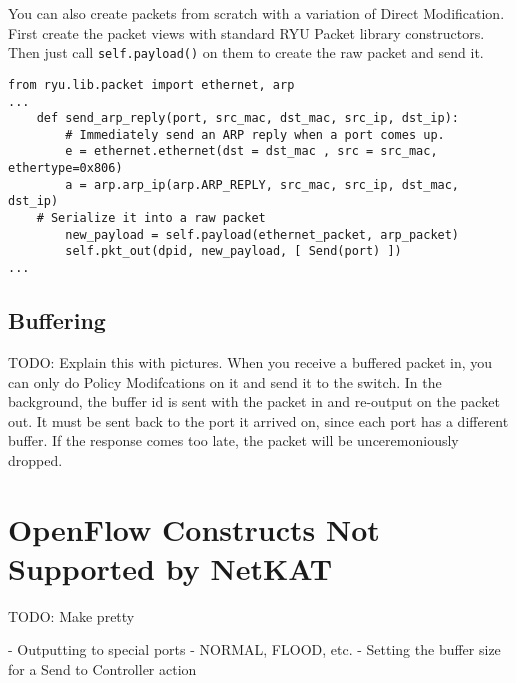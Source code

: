 You can also create packets from scratch with a variation of Direct Modification.  
First create the packet views with standard RYU Packet library constructors.
Then just call \texttt{self.payload()} on them to create the raw packet and send it.  

\begin{lstlisting}
from ryu.lib.packet import ethernet, arp
...
    def send_arp_reply(port, src_mac, dst_mac, src_ip, dst_ip):
        # Immediately send an ARP reply when a port comes up.
        e = ethernet.ethernet(dst = dst_mac , src = src_mac, ethertype=0x806)
        a = arp.arp_ip(arp.ARP_REPLY, src_mac, src_ip, dst_mac, dst_ip)
	# Serialize it into a raw packet
        new_payload = self.payload(ethernet_packet, arp_packet)
        self.pkt_out(dpid, new_payload, [ Send(port) ])	
...
\end{lstlisting}

\subsection{Buffering}

TODO: Explain this with pictures.
When you receive a buffered packet in, you can only do Policy Modifcations on it and send it
to the switch.
In the background, the buffer id is sent with the packet in and re-output on the packet out.  
It must be sent back to the port it arrived on, since each port has a different buffer.
If the response comes too late, the packet will be unceremoniously dropped.  


\section{OpenFlow Constructs Not Supported by NetKAT}

TODO: Make pretty

- Outputting to special ports - NORMAL, FLOOD, etc.
- Setting the buffer size for a Send to Controller action